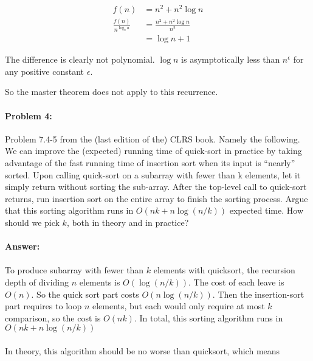 \documentclass{article}
\begin{document}
$$\begin{aligned}
f(n)&=n^2+n^2\log n\\
\frac{f(n)}{n^{\log_b a}}&=\frac{n^2+n^2\log n}{n^2}\\
&=\log n+1
\end{aligned}$$

The difference is clearly not polynomial. $\log n$ is asymptotically less than $n^\epsilon$ for any positive constant $\epsilon$.

So the master theorem does not apply to this recurrence.



\newpage
\paragraph{Problem 4:} 
Problem 7.4-5 from the (last edition of the) CLRS book. Namely the following. We can improve the (expected) running time of quick-sort in practice by taking advantage of the fast running time of insertion sort when its input is “nearly” sorted. Upon calling quick-sort on a subarray with fewer than k elements, let it simply return without
sorting the sub-array. After the top-level call to quick-sort returns, run insertion sort on the entire array to finish the sorting process. Argue that this sorting algorithm runs in $O(nk + n \log (n/k))$ expected time. How should we pick $k$, both in theory and in practice?


\paragraph{Answer:}


\paragraph{}
To produce subarray with fewer than $k$ elements with quicksort, the recursion depth of dividing $n$ elements  is $O(\log (n/k))$. The cost of each leave is $O(n)$. So the quick sort part costs $O(n\log (n/k))$. Then the insertion-sort part requires to loop $n$ elements, but each would only require at most $k$ comparison, so the cost is $O(nk)$. In total, this sorting algorithm runs in $O(nk+n\log (n/k))$

\paragraph{}
In theory, this algorithm should be no worse than quicksort, which means
\end{document}
